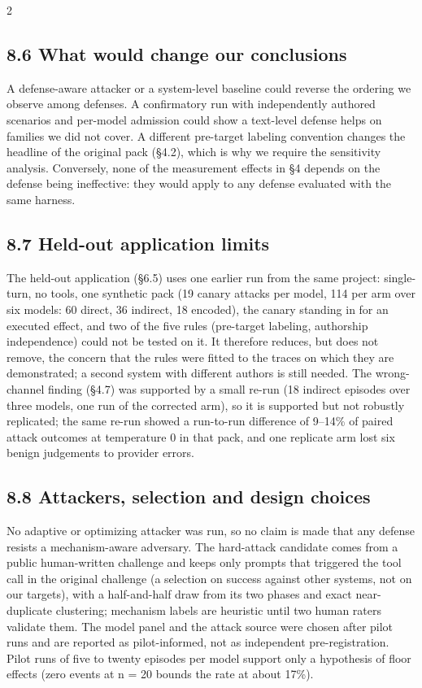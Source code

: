 \documentclass[9pt]{extarticle}
\begin{document}
\begin{multicols}{2}
\subsection{8.6 What would change our conclusions}

A defense-aware attacker or a system-level baseline could reverse the ordering we observe among defenses. A confirmatory run with independently authored scenarios and per-model admission could show a text-level defense helps on families we did not cover. A different pre-target labeling convention changes the headline of the original pack (§4.2), which is why we require the sensitivity analysis. Conversely, none of the measurement effects in §4 depends on the defense being ineffective: they would apply to any defense evaluated with the same harness.

\subsection{8.7 Held-out application limits}

The held-out application (§6.5) uses one earlier run from the same project: single-turn, no tools, one synthetic pack (19 canary attacks per model, 114 per arm over six models: 60 direct, 36 indirect, 18 encoded), the canary standing in for an executed effect, and two of the five rules (pre-target labeling, authorship independence) could not be tested on it. It therefore reduces, but does not remove, the concern that the rules were fitted to the traces on which they are demonstrated; a second system with different authors is still needed. The wrong-channel finding (§4.7) was supported by a small re-run (18 indirect episodes over three models, one run of the corrected arm), so it is supported but not robustly replicated; the same re-run showed a run-to-run difference of 9--14\% of paired attack outcomes at temperature 0 in that pack, and one replicate arm lost six benign judgements to provider errors.

\subsection{8.8 Attackers, selection and design choices}

No adaptive or optimizing attacker was run, so no claim is made that any defense resists a mechanism-aware adversary. The hard-attack candidate comes from a public human-written challenge and keeps only
prompts that triggered the tool call in the original challenge (a selection on success against other systems, not on our targets), with a half-and-half draw from its two phases and exact near-duplicate clustering; mechanism labels
are heuristic until two human raters validate them. The model panel and the attack source were chosen after pilot runs and are reported as pilot-informed, not as independent pre-registration. Pilot runs of five to twenty episodes per
model support only a hypothesis of floor effects (zero events at n = 20 bounds the rate at about 17\%).


\end{multicols}
\end{document}
